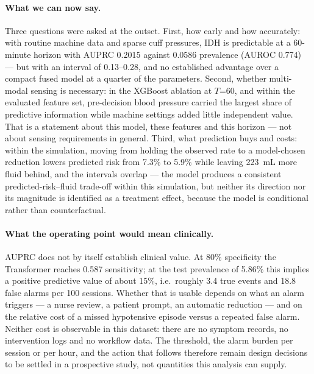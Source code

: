 \documentclass{article}
\begin{document}
\paragraph{What we can now say.} Three questions were asked at the outset. First, how early and how accurately: with routine machine data and sparse cuff pressures, IDH is predictable at a
60-minute horizon with AUPRC 0.2015 against 0.0586 prevalence (AUROC 0.774) --- but with an interval of 0.13--0.28, and no
established advantage over a compact fused model at a quarter of the parameters. Second, whether multi-modal sensing is necessary: in the XGBoost ablation at $T$=60, and within the evaluated feature set,
pre-decision blood pressure carried the largest share of predictive information while machine settings added little
independent value. That is a statement about this model, these features and this horizon --- not about sensing requirements in
general. Third, what prediction buys and costs: within the simulation, moving from holding the observed rate to a model-chosen
reduction lowers predicted risk from 7.3\% to 5.9\% while leaving 223~mL more fluid behind, and the intervals overlap --- the model produces a consistent predicted-risk--fluid trade-off within this
simulation, but neither its direction nor its magnitude is identified as a treatment effect, because the model is
conditional rather than counterfactual.

\paragraph{What the operating point would mean clinically.} AUPRC does not by itself establish clinical value. At 80\%
specificity the Transformer reaches 0.587 sensitivity; at the test prevalence of 5.86\% this implies a positive predictive
value of about 15\%, i.e.\ roughly 3.4 true events and 18.8 false alarms per 100 sessions. Whether that is usable depends on
what an alarm triggers --- a nurse review, a patient prompt, an automatic reduction --- and on the relative cost of a missed
hypotensive episode versus a repeated false alarm. Neither cost is observable in this dataset: there are no symptom records,
no intervention logs and no workflow data. The threshold, the alarm burden per session or per hour, and the action that
follows therefore remain design decisions to be settled in a prospective study, not quantities this analysis can supply.
\end{document}
